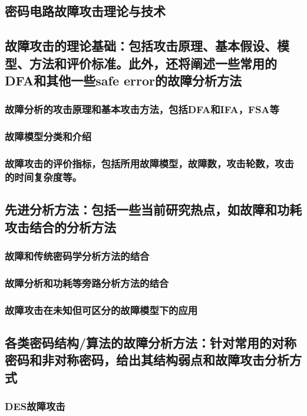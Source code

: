 \documentclass[a4paper,12pt]{article}
\begin{document}
\begin{CJK}{UTF8}{gkai}
\section{密码电路故障攻击理论与技术}
\subsection{故障攻击的理论基础：包括攻击原理、基本假设、模型、方法和评价标准。此外，还将阐述一些常用的DFA和其他一些safe error的故障分析方法}
\subsubsection{故障分析的攻击原理和基本攻击方法，包括DFA和IFA，FSA等}
\subsubsection{故障模型分类和介绍}
\subsubsection{故障攻击的评价指标，包括所用故障模型，故障数，攻击轮数，攻击的时间复杂度等。}
\subsection{先进分析方法：包括一些当前研究热点，如故障和功耗攻击结合的分析方法}
\subsubsection{故障和传统密码学分析方法的结合}
\subsubsection{故障分析和功耗等旁路分析方法的结合}
\subsubsection{故障攻击在未知但可区分的故障模型下的应用}
\subsection{各类密码结构/算法的故障分析方法：针对常用的对称密码和非对称密码，给出其结构弱点和故障攻击分析方式}
\subsubsection{DES故障攻击}

\end{CJK}
\end{document}
